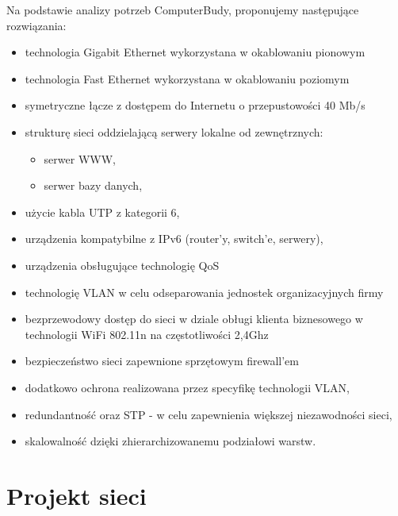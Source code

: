 \documentclass{report}
\begin{document}
Na podstawie analizy potrzeb ComputerBudy, proponujemy
następujące rozwiązania:

\begin{itemize}

\item{technologia Gigabit Ethernet wykorzystana w okablowaniu pionowym}

\item{technologia Fast Ethernet wykorzystana w okablowaniu poziomym}

\item{symetryczne łącze z dostępem do Internetu o przepustowości 40 Mb/s}

\item{strukturę sieci oddzielającą serwery lokalne od zewnętrznych:
 \begin{itemize}
\item serwer WWW,
\item serwer bazy danych,
\end{itemize}}

\item {użycie kabla UTP z kategorii 6,}

\item {urządzenia kompatybilne z IPv6 (router’y, switch’e, serwery),}

\item {urządzenia obsługujące technologię QoS}

\item{technologię VLAN w celu odseparowania jednostek organizacyjnych firmy}

\item{bezprzewodowy dostęp do sieci w dziale obługi klienta biznesowego w technologii WiFi
802.11n na częstotliwości 2,4Ghz}

\item{bezpieczeństwo sieci zapewnione sprzętowym firewall’em}

\item{dodatkowo ochrona realizowana przez specyfikę technologii VLAN,}

\item{redundantność oraz STP - w celu zapewnienia większej niezawodności sieci,}

\item{skalowalność dzięki zhierarchizowanemu podziałowi warstw.}

\end{itemize}


\chapter{Projekt sieci}
\end{document}
